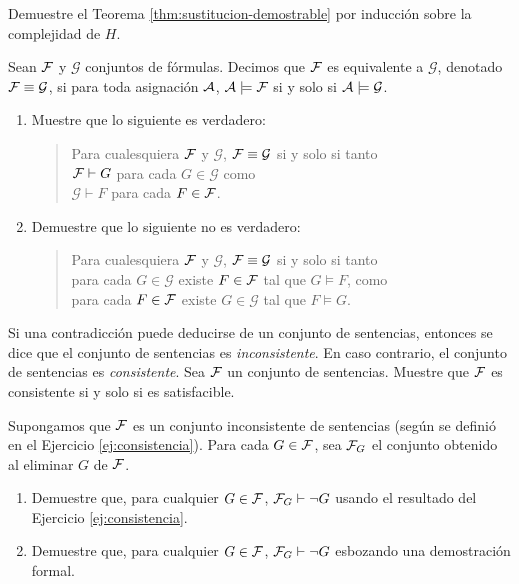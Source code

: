 \message{ !name(main.tex)}\documentclass[12pt,a4paper]{book}
\newcommand{\GG}{\mathcal{G}}
\begin{document}
    \begin{ejercicio}\label{ej:sustitucion-demostrable-completa}
        Demuestre el Teorema \ref{thm:sustitucion-demostrable} por inducción sobre la complejidad de $H$.
    \end{ejercicio}

    \begin{ejercicio}
        Sean $\FF$ y $\GG$ conjuntos de fórmulas. Decimos que $\FF$ es equivalente a $\GG$, denotado $\FF\equiv\GG$, si para
        toda asignación $\AA$, $\AA\models\FF$ si y solo si $\AA\models\GG$.
        \begin{enumerate}[label=(\alph*)]
            \item Muestre que lo siguiente es verdadero:
            \begin{quote}
                Para cualesquiera $\FF$ y $\GG$, $\FF\equiv\GG$ si y solo si tanto\\
                $\FF\vdash G$ para cada $G\in\GG$ como\\
                $\GG\vdash F$ para cada $F\in\FF$.
            \end{quote}
            \item Demuestre que lo siguiente no es verdadero:
            \begin{quote}
                Para cualesquiera $\FF$ y $\GG$, $\FF\equiv\GG$ si y solo si tanto\\
                para cada $G\in\GG$ existe $F\in\FF$ tal que $G\models F$, como\\
                para cada $F\in\FF$ existe $G\in\GG$ tal que $F\models G$.
            \end{quote}
        \end{enumerate}
    \end{ejercicio}

    \begin{ejercicio}\label{ej:consistencia}
        Si una contradicción puede deducirse de un conjunto de sentencias, entonces se dice que el conjunto de sentencias
        es \textit{inconsistente}. En caso contrario, el conjunto de sentencias es \textit{consistente}. Sea $\FF$ un
        conjunto de sentencias. Muestre que $\FF$ es consistente si y solo si es satisfacible.
    \end{ejercicio}

    \begin{ejercicio}
        Supongamos que $\FF$ es un conjunto inconsistente de sentencias (según se definió en el Ejercicio
        \ref{ej:consistencia}). Para cada $G\in\FF$, sea $\FF_{G}$ el conjunto obtenido al eliminar $G$ de $\FF$.
        \begin{enumerate}[label=(\alph*)]
            \item Demuestre que, para cualquier $G\in\FF$, $\FF_{G}\vdash\neg G$ usando el resultado del Ejercicio
            \ref{ej:consistencia}.
            \item Demuestre que, para cualquier $G\in\FF$, $\FF_{G}\vdash\neg G$ esbozando una demostración formal.
        \end{enumerate}
    \end{ejercicio}
\end{document}
